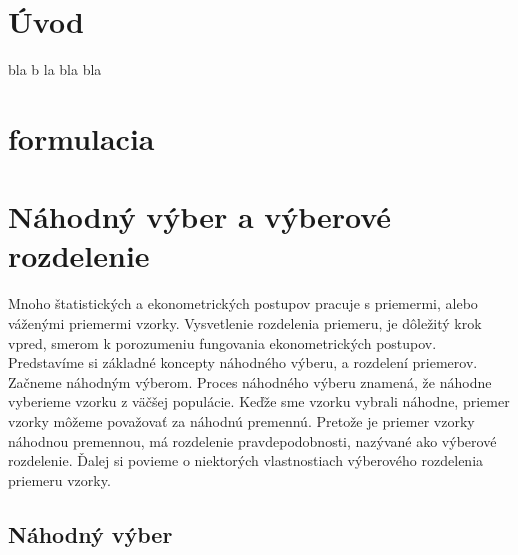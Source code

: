 \documentclass[]{tukediphc}
\begin{document}
\kpredhovoru

\thispagestyle{empty}
\tableofcontents
\newpage

\thispagestyle{empty}

{	\makeatletter
	\renewcommand{\l@figure}{\@dottedtocline{1}{1.5em}{3.5em}}
	\makeatother
	\listoffigures}



\newpage

\thispagestyle{empty}
\listoftables
\newpage

\thispagestyle{empty}

\newpage



\section{Úvod}

bla b la bla bla

\section{formulacia}
%


\section{Náhodný výber a výberové rozdelenie}

Mnoho štatistických a ekonometrických postupov pracuje s priemermi, alebo váženými priemermi vzorky. Vysvetlenie rozdelenia priemeru, je dôležitý krok vpred, smerom k porozumeniu fungovania ekonometrických postupov. Predstavíme si základné koncepty náhodného výberu, a rozdelení priemerov. Začneme náhodným výberom. Proces náhodného výberu znamená, že náhodne vyberieme vzorku z väčšej populácie. Keďže sme vzorku vybrali náhodne, priemer vzorky môžeme považovať za náhodnú premennú. Pretože je priemer vzorky náhodnou premennou, má rozdelenie pravdepodobnosti, nazývané ako výberové rozdelenie. Ďalej si povieme o niektorých vlastnostiach výberového rozdelenia priemeru vzorky. 

\subsection{Náhodný výber}
\end{document}
